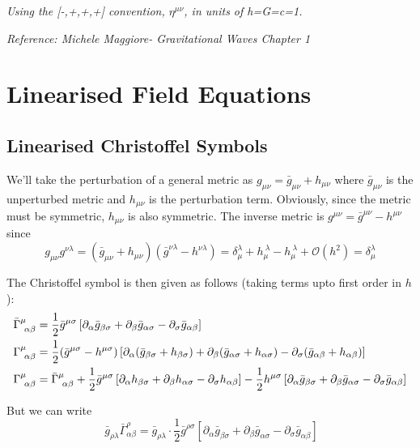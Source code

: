 \documentclass[12pt, letterpaper]{report}
\begin{document}
\emph{Using the [-,+,+,+] convention, $\eta^{\mu\nu}$, in units of h=G=c=1.}

\emph{Reference: Michele Maggiore- Gravitational Waves Chapter 1}

\section{Linearised Field Equations}

\subsection{Linearised Christoffel Symbols}

We'll take the perturbation of a general metric as $g_{\mu\nu}= \bar{g}_{\mu\nu}+h_{\mu\nu}$ where $\bar{g}_{\mu\nu}$ is the unperturbed metric and $h_{\mu\nu}$ is the perturbation term. Obviously, since the metric must be symmetric, $h_{\mu\nu}$ is also symmetric. The inverse metric is $g^{\mu\nu}= \bar{g}^{\mu\nu}- {h}^{\mu\nu}$ since $${g}_{\mu\nu}{g}^{\nu\lambda}= \left( \bar{g}_{\mu\nu}+ {h}_{\mu\nu} \right)\left( \bar{g}^{\nu\lambda}- {h}^{\nu\lambda} \right)= \delta_\mu^\lambda+h_\mu^{\ \lambda}-h_\mu^{\ \lambda}+\mathcal{O}(h^2) = \delta_\mu^\lambda$$

The Christoffel symbol is then given as follows (taking terms upto first order in $h$): 
\setlength{\jot}{10pt}
\begin{align}
    \bar{\Gamma}^{\mu}_{\ \alpha\beta}&= \frac{1}{2}\bar{g}^{\mu\sigma}\left[\partial_\alpha\bar{g}_{\beta\sigma}+\partial_{\beta}\bar{g}_{\alpha\sigma}-\partial_{\sigma}\bar{g}_{\alpha\beta}\right] \nonumber\\
    \Gamma^{\mu}_{\ \alpha\beta}&= \frac{1}{2}\qty(\bar{g}^{\mu\sigma}-h^{\mu\sigma})\left[\partial_\alpha \qty(\bar{g}_{\beta\sigma}+h_{\beta\sigma})+\partial_{\beta}\qty(\bar{g}_{\alpha\sigma}+h_{\alpha\sigma})-\partial_{\sigma}\qty(\bar{g}_{\alpha\beta}+h_{\alpha\beta})\right] \nonumber\\
    \Gamma^{\mu}_{\ \alpha\beta}&= \bar{\Gamma}^{\mu}_{\ \alpha\beta}+\frac{1}{2}\bar{g}^{\mu\sigma}\left[\partial_\alpha h_{\beta\sigma}+\partial_{\beta}h_{\alpha\sigma}-\partial_{\sigma}h_{\alpha\beta}\right]-\frac{1}{2}h^{\mu\sigma}\left[\partial_\alpha \bar{g}_{\beta\sigma}+\partial_{\beta}\bar{g}_{\alpha\sigma}-\partial_{\sigma}\bar{g}_{\alpha\beta}\right] \label{christ pert step1}
\end{align}

But we can write $$\ \bar{g}_{\rho\lambda}\bar{\Gamma}^{\rho}_{\alpha\beta}= \bar{g}_{\rho\lambda}\cdot\frac{1}{2}\bar{g}^{\rho\sigma}\left[\partial_\alpha \bar{g}_{\beta\sigma}+\partial_{\beta}\bar{g}_{\alpha\sigma}-\partial_{\sigma}\bar{g}_{\alpha\beta}\right]$$
\end{document}
